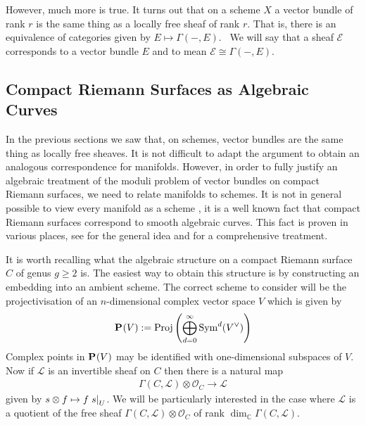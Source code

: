 \documentclass[12pt]{ociamthesis}  %
\begin{document}
However, much more is true. It turns out that on a scheme $X$
a vector bundle of rank $r$ is the same thing as a locally
free sheaf of rank $r$. That is, there is an equivalence
of categories given by $E \mapsto \Gamma(-,E)$.~\cite[128-129]{hartshorne1977}
We will say that a sheaf $\mathscr E$ corresponds to a vector bundle
$E$ and to mean $\mathscr E\cong\Gamma(-,E)$.

\subsection{Compact Riemann Surfaces as Algebraic Curves}
\label{sec:surfaces_as_curves}

In the previous sections we saw that, on schemes, vector bundles are
the same thing as locally free sheaves. It is not difficult to adapt
the argument to obtain an analogous correspondence for manifolds.
However, in order to fully justify an algebraic treatment of the
moduli problem of vector bundles on compact Riemann surfaces, we
need to relate manifolds to schemes. It is not in general possible
to view every manifold as a scheme \missingcitation, it is a well
known fact that compact Riemann surfaces correspond to smooth
algebraic curves.
This fact is proven in various places, see \cite[215]{griffiths1994}
for the general idea and \cite[5-16]{harris2011}
for a comprehensive treatment.

It is worth recalling what the algebraic structure on a compact
Riemann surface $C$ of genus $g\geq 2$ is. The easiest way to obtain
this structure is by constructing an embedding into an ambient
scheme. The correct scheme to consider will be the projectivisation
of an $n$-dimensional complex vector space $V$ which is given
by
\begin{align*}
  \mathbf{P}^{}_{}(V) := \operatorname{Proj}\left({
        \bigoplus_{d=0}^\infty \operatorname{Sym}^d(V^\vee)
      }\right)
\end{align*}
Complex points in $\mathbf{P}^{}_{}(V)$ may be identified
with one-dimensional subspaces of $V$. \missingcitation
Now if $\mathscr L$ is
an invertible sheaf on $C$ then there is a natural map
\begin{align}\label{eq:natural_line_bundle_map}
  \Gamma(C,\mathscr L)\otimes\mathscr O_C \to \mathscr L
\end{align}
given by $s\otimes f \mapsto f\left.{s}\right\vert_{U}$. We will be
particularly interested in the case where $\mathscr L$ is a
quotient of the free sheaf
$\Gamma(C,\mathscr L)\otimes\mathscr O_C$ of rank
$\dim_{\mathbb C} \Gamma(C,\mathscr L)$.
\end{document}
